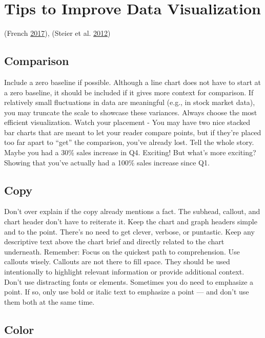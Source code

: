 \documentclass[]{book}
\theoremstyle{definition}
\theoremstyle{definition}
\theoremstyle{definition}
\theoremstyle{remark}
\begin{document}
\section{Tips to Improve Data
Visualization}\label{tips-to-improve-data-visualization}

(French \protect\hyperlink{ref-French}{2017}), (Steier et al.
\protect\hyperlink{ref-Steier}{2012})

\subsection{Comparison}\label{comparison}

Include a zero baseline if possible. Although a line chart does not have
to start at a zero baseline, it should be included if it gives more
context for comparison. If relatively small fluctuations in data are
meaningful (e.g., in stock market data), you may truncate the scale to
showcase these variances. Always choose the most efficient
visualization. Watch your placement - You may have two nice stacked bar
charts that are meant to let your reader compare points, but if they're
placed too far apart to ``get'' the comparison, you've already lost.
Tell the whole story. Maybe you had a 30\% sales increase in Q4.
Exciting! But what's more exciting? Showing that you've actually had a
100\% sales increase since Q1.

\subsection{Copy}\label{copy}

Don't over explain if the copy already mentions a fact. The subhead,
callout, and chart header don't have to reiterate it. Keep the chart and
graph headers simple and to the point. There's no need to get clever,
verbose, or puntastic. Keep any descriptive text above the chart brief
and directly related to the chart underneath. Remember: Focus on the
quickest path to comprehension. Use callouts wisely. Callouts are not
there to fill space. They should be used intentionally to highlight
relevant information or provide additional context. Don't use
distracting fonts or elements. Sometimes you do need to emphasize a
point. If so, only use bold or italic text to emphasize a point --- and
don't use them both at the same time.

\subsection{Color}\label{color}
\end{document}
